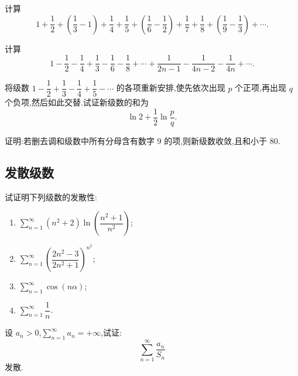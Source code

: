 \documentclass[../数学分析培优讲义.tex]{subfiles}
\begin{document}
\begin{example}
计算
\[
    1+\dfrac{1}{2}+\left(\dfrac{1}{3}-1\right)+\dfrac{1}{4}+\dfrac{1}{5}
    +\left(\dfrac{1}{6}-\dfrac{1}{2}\right)+\dfrac{1}{7}+\dfrac{1}{8}
    +\left(\dfrac{1}{9}-\dfrac{1}{3}\right)+\cdots.
\]
\end{example}
\exampleblank

\begin{example}
计算
\[
    1-\dfrac{1}{2}-\dfrac{1}{4}+\dfrac{1}{3}-\dfrac{1}{6}-\dfrac{1}{8}
    +\cdots+\dfrac{1}{2n-1}-\dfrac{1}{4n-2}-\dfrac{1}{4n}+\cdots.
\]
\end{example}
\exampleblank

\begin{example}
将级数 $\displaystyle1-\dfrac{1}{2}+\dfrac{1}{3}-\dfrac{1}{4}+\dfrac{1}{5}-\cdots$ 的各项重新安排,使先依次出现 $p$ 个正项,再出现 $q$ 个负项,然后如此交替.试证新级数的和为
\[
    \ln2+\dfrac{1}{2}\ln\dfrac{p}{q}.
\]
\end{example}
\exampleblank

\begin{example}
证明:若删去调和级数中所有分母含有数字 $9$ 的项,则新级数收敛,且和小于 $80$.
\end{example}
\exampleblank


\newpage

\subsection{发散级数}

\begin{example}
试证明下列级数的发散性:
\begin{enumerate}[label=(\arabic*)]
    \item $\displaystyle\sum\limits_{n=1}^{\infty}(n^2+2)\ln\left(\dfrac{n^2+1}{n^2}\right)$;
    \item $\displaystyle\sum\limits_{n=1}^{\infty}\left(\dfrac{2n^2-3}{2n^2+1}\right)^{n^2}$;
    \item $\displaystyle\sum\limits_{n=1}^{\infty}\cos(n\alpha)$;
    \item $\displaystyle\sum\limits_{n=1}^{\infty}\dfrac{1}{n}$.
\end{enumerate}
\end{example}
\exampleblank

\begin{example}
设 $a_n>0$,$\displaystyle\sum\limits_{n=1}^{\infty}a_n=+\infty$,试证:
\[
    \sum\limits_{n=1}^{\infty}\dfrac{a_n}{S_n}
\]
发散.
\end{example}
\exampleblank
\end{document}
